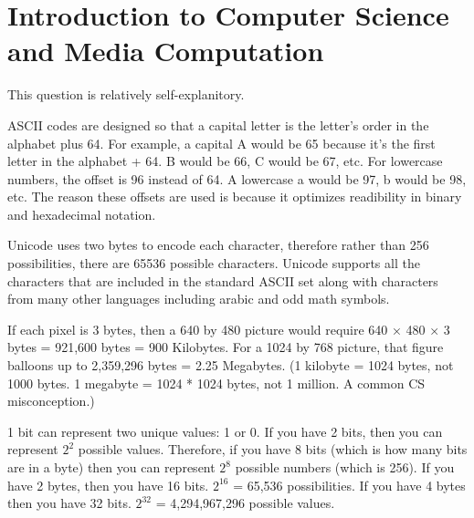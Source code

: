 \chapter{Introduction to Computer Science and Media Computation}

\begin{exercises}

\begin{ex}
This question is relatively self-explanitory. 
\end{ex}

\begin{ex} 
ASCII codes are designed so that a capital letter is the letter's order in
the alphabet plus 64. For example, a capital A would be 65 because it's the
first letter in the alphabet + 64. B would be 66, C would be 67, etc. For
lowercase numbers, the offset is 96 instead of 64. A lowercase a would be
97, b would be 98, etc. The reason these offsets are used is because it
optimizes readibility in binary and hexadecimal notation.
\end{ex}

\begin{ex}
Unicode uses two bytes to encode each character, therefore rather than 256
possibilities, there are 65536 possible characters. Unicode supports all
the characters that are included in the standard ASCII set along with
characters from many other languages including arabic and odd math symbols.
\end{ex}

\begin{ex}
If each pixel is 3 bytes, then a 640 by 480 picture would require 640 × 480
× 3 bytes = 921,600 bytes = 900 Kilobytes.  For a 1024 by 768 picture, that
figure balloons up to 2,359,296 bytes = 2.25 Megabytes. (1 kilobyte = 1024
bytes, not 1000 bytes. 1 megabyte = 1024 * 1024 bytes, not 1 million. A
common CS misconception.)
\end{ex}



\begin{ex}
1 bit can represent two unique values: 1 or 0. If you have 2 bits, then you
can represent $2^2$  possible values. Therefore, if you have 8 bits (which is
how many bits are in a byte) then you can represent $2^8$ possible numbers
(which is 256). If you have 2 bytes, then you have 16 bits. $2^{16}$ =
65,536 possibilities. If you have 4 bytes then you have 32 bits. $2^{32}$ =
4,294,967,296 possible values.
\end{ex}


\begin{ex}

\end{ex}

\begin{ex}
\end{ex}

\begin{ex}
\end{ex}

\begin{ex}
\end{ex}

\end{exercises}

